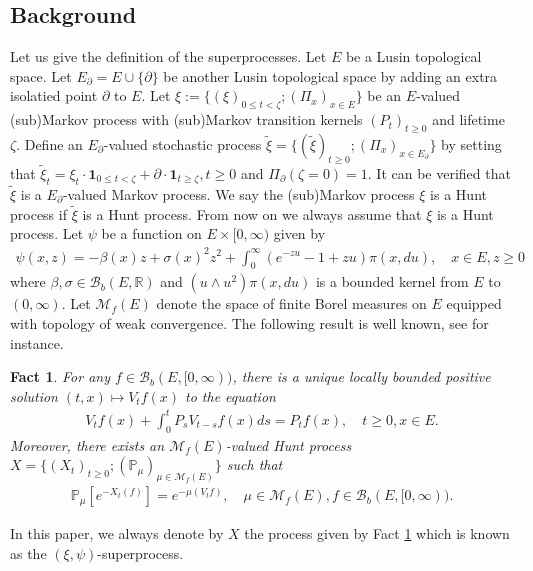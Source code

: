 \documentclass[12pt,a4paper]{amsart}
\numberwithin{equation}{section}
\theoremstyle{plain}
\newtheorem{fact}[thm]{Fact}
\theoremstyle{definition}
\theoremstyle{remark}
\begin{document}
\subsection{Background}
\par
Let us give the definition of the superprocesses.
Let $E$ be a Lusin topological space.
Let $E_\partial = E\cup\{\partial\} $ be another Lusin topological space by adding an extra isolatied point $\partial$ to $E$.
Let $\xi:= \{(\xi)_{0\leq t < \zeta}; (\Pi_x)_{x\in E}\}$ be an $E$-valued (sub)Markov process with (sub)Markov transition kernels $(P_t)_{t\geq 0}$ and lifetime $\zeta$.
Define an $E_\partial$-valued stochastic process $\tilde \xi = \{(\tilde \xi)_{t\geq 0} ; (\Pi_{x})_{x\in {E_\partial}}\} $ by setting that $\tilde \xi_t = \xi_t\cdot \mathbf 1_{0\leq t< \zeta} + \partial \cdot \mathbf 1_{t\geq \zeta}, t\geq 0$ and $\Pi_\partial (\zeta = 0) = 1$.
It can be verified that $\tilde \xi$ is a $E_\partial$-valued Markov process.
We say the (sub)Markov process $\xi$ is a Hunt process if $\tilde \xi$ is a Hunt process.
From now on we always assume that $\xi$ is a Hunt process.
Let $\psi$ be a function on $E \times [0,\infty)$ given by
\begin{align}
\psi(x,z)
= -\beta(x) z + \sigma(x)^2 z^2 + \int_0^\infty (e^{-zu} -1 + zu) \pi(x,du),
\quad x\in E, z\geq 0
\end{align}
where $\beta, \sigma \in \mathcal B_b(E,\mathbb R)$ and $(u \wedge u^2) \pi(x,du)$ is a bounded kernel from $E$ to $(0,\infty)$.
Let $\mathcal M_f(E)$ denote the space of finite Borel measures on $E$ equipped with topology of weak convergence.
The following result is well known, see \cite{Li2011MeasureValued} for instance.
\begin{fact} \label{Fact:S!}
For any $f \in \mathcal B_b(E, [0,\infty))$, there is a unique locally bounded positive solution $(t,x)\mapsto V_tf(x)$ to the equation
\begin{align}
V_tf(x) + \int_0^t P_{s}V_{t-s}f(x)ds
= P_tf(x), \quad t\geq 0, x\in E.
\end{align}
Moreover, there exists an $\mathcal M_f(E)$-valued Hunt process $X =\{(X_t)_{t\geq 0}; (\mathbb P_\mu)_{\mu \in \mathcal M_f(E)}\}$ such that
\begin{align}
\mathbb P_\mu[e^{- X_t(f)}]
= e^{- \mu(V_tf)}, \quad \mu \in \mathcal M_f(E),
f \in \mathcal B_b(E,[0,\infty)).
\end{align}
\end{fact}
In this paper, we always denote by $X$ the process given by Fact \ref{Fact:S!} which is known as the $(\xi, \psi)$-superprocess.
\end{document}
